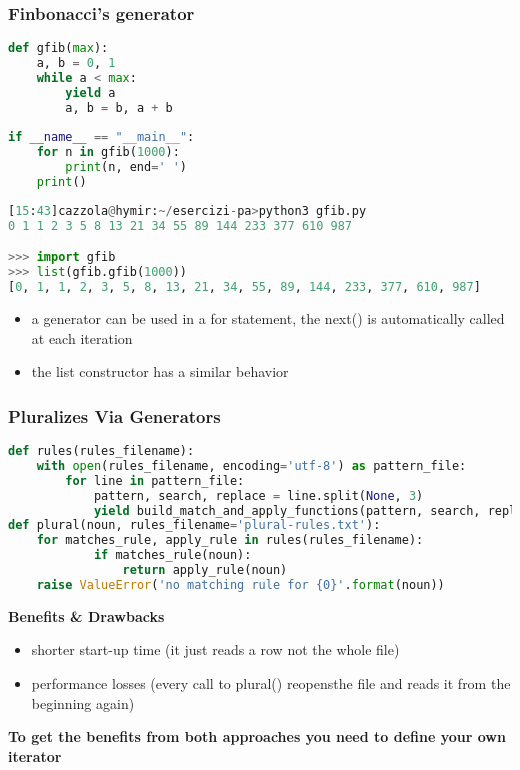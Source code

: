 \subsubsection{Finbonacci's generator}
\begin{lstlisting}[language=Python]
def gfib(max):
	a, b = 0, 1
	while a < max:
		yield a
		a, b = b, a + b
		
if __name__ == "__main__":
	for n in gfib(1000):
		print(n, end=' ')
	print()
\end{lstlisting}

\begin{lstlisting}[language=Python]
[15:43]cazzola@hymir:~/esercizi-pa>python3 gfib.py
0 1 1 2 3 5 8 13 21 34 55 89 144 233 377 610 987

>>> import gfib
>>> list(gfib.gfib(1000))
[0, 1, 1, 2, 3, 5, 8, 13, 21, 34, 55, 89, 144, 233, 377, 610, 987]
\end{lstlisting}

\begin{itemize}
	\item a generator can be used in a for statement, the next() is automatically called at each iteration
	\item the list constructor has a similar behavior
\end{itemize}

\subsubsection{Pluralizes Via Generators}

\begin{lstlisting}[language=Python]
def rules(rules_filename):
	with open(rules_filename, encoding='utf-8') as pattern_file:
		for line in pattern_file:
			pattern, search, replace = line.split(None, 3)
			yield build_match_and_apply_functions(pattern, search, replace)
def plural(noun, rules_filename='plural-rules.txt'):
	for matches_rule, apply_rule in rules(rules_filename):
			if matches_rule(noun):
				return apply_rule(noun)
	raise ValueError('no matching rule for {0}'.format(noun))
\end{lstlisting}

\textbf{Benefits \& Drawbacks}
\begin{itemize}
	\item shorter start-up time (it just reads a row not the whole file)
	\item performance losses (every call to plural() reopensthe file and reads it from the beginning again)
\end{itemize}

\textbf{To get the benefits from both approaches you need to define your own iterator}